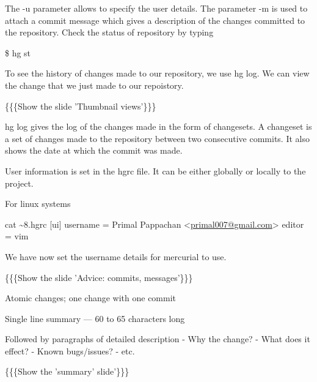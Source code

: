 \documentclass[a4paper,english]{article}
\begin{document}

The -u parameter allows to specify the user details. The parameter -m is used to attach a commit message which gives a description of the changes committed to the repository. Check the status of repository by typing


\$ hg st


To see the history of changes made to our repository, we use hg log. We can view the change that we just made to our repoistory.


\{\{\{Show the slide 'Thumbnail views'\}\}\}


hg log gives the log of the changes made in the form of changesets. A changeset is a set of changes made to the repository between two consecutive commits. It also shows the date at which the commit was made.


User information is set in the hgrc file. It can be either globally or locally to the project.


For linux systems

cat \textasciitilde{}8.hgrc
{[}ui{]}
username = Primal Pappachan <\href{mailto:primal007@gmail.com}{primal007@gmail.com}>
editor = vim


We have now set the username details for mercurial to use.


\{\{\{Show the slide 'Advice: commits, messages'\}\}\}

\setcounter{listcnt0}{0}
\begin{list}{.}
{
\setlength{\rightmargin}{\leftmargin}
}

\item Atomic changes; one change with one commit

\item Single line summary — 60 to 65 characters long

\item Followed by paragraphs of detailed description
-  Why the change?
- What does it effect?
- Known bugs/issues?
- etc.
\end{list}


\{\{\{Show the 'summary' slide'\}\}\}
\end{document}
